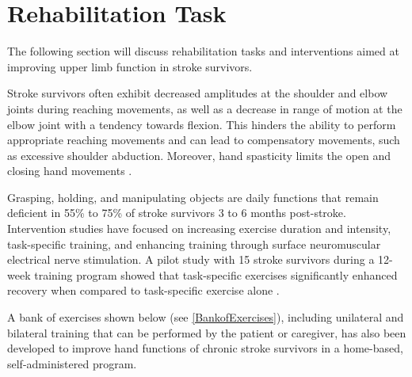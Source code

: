 \section{Rehabilitation Task} \label{rehabilitation_task}

The following section will discuss rehabilitation tasks and interventions aimed at improving upper limb function in stroke survivors.

Stroke survivors often exhibit decreased amplitudes at the shoulder and elbow joints during reaching movements, as well as a decrease in range of motion at the elbow joint with a tendency towards flexion. This hinders the ability to perform appropriate reaching movements and can lead to compensatory movements, such as excessive shoulder abduction. Moreover, hand spasticity limits the open and closing hand movements \cite{Kantak2017}.

Grasping, holding, and manipulating objects are daily functions that remain deficient in 55\% to 75\% of stroke survivors 3 to 6 months post-stroke. Intervention studies have focused on increasing exercise duration and intensity, task-specific training, and enhancing training through surface neuromuscular electrical nerve stimulation. A pilot study with 15 stroke survivors during a 12-week training program showed that task-specific exercises significantly enhanced recovery when compared to task-specific exercise alone \cite{Alon2007}.

A bank of exercises shown below (see \ref{BankofExercises}), including unilateral and bilateral training that can be performed by the patient or caregiver, has also been developed to improve hand functions of chronic stroke survivors in a home-based, self-administered program. 

